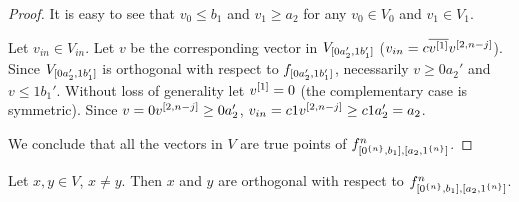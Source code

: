 \begin{proof}
It is easy to see that $v_0 \leq b_1$ and $v_1 \geq a_2$
for any $v_0 \in V_0$ and $v_1 \in V_1$.

Let $v_{in} \in V_{in}$.
Let $v$ be the corresponding vector
in $V_{[0 a_2', 1 b_1']}$
($v_{in} = c \overline{v^{[1]}} v^{[2, n-j]}$).
Since $V_{[0 a_2', 1 b_1']}$
is orthogonal with respect to
$f_{[0 a_2', 1 b_1']}$,
necessarily $v \geq 0 a_2'$ and $v \leq 1 b_1'$.
Without loss of generality let $v^{[1]} = 0$
(the complementary case is symmetric).
Since $v = 0 v^{[2, n-j]} \geq 0 a_2'$,
$v_{in} = c 1 v^{[2, n-j]}
\geq c 1 a_2' = a_2$.

We conclude that all the vectors in $V$
are true points of $f^{n}_{[0^{\{n\}}, b_1], [a_2, 1^{\{n\}}]}$.
\end{proof}

\begin{lemma}
Let $x, y \in V$, $x \neq y$.
Then $x$ and $y$ are orthogonal with respect to $f^{n}_{[0^{\{n\}}, b_1], [a_2, 1^{\{n\}}]}$.
\end{lemma}

